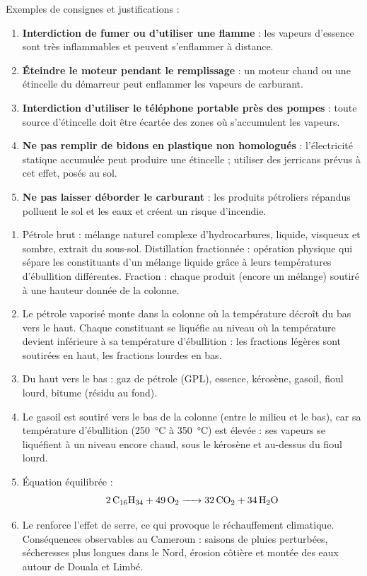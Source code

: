 \documentclass[11pt]{article}
\newcommand{\cle}[1]{{\popxbold\color{popdark}#1}}
\begin{document}
\begin{corrige}
Exemples de consignes et justifications :
\begin{enumerate}
\item \textbf{Interdiction de fumer ou d'utiliser une flamme} : les vapeurs d'essence sont très inflammables et peuvent s'enflammer à distance.
\item \textbf{Éteindre le moteur pendant le remplissage} : un moteur chaud ou une étincelle du démarreur peut enflammer les vapeurs de carburant.
\item \textbf{Interdiction d'utiliser le téléphone portable près des pompes} : toute source d'étincelle doit être écartée des zones où s'accumulent les vapeurs.
\item \textbf{Ne pas remplir de bidons en plastique non homologués} : l'électricité statique accumulée peut produire une étincelle ; utiliser des jerricans prévus à cet effet, posés au sol.
\item \textbf{Ne pas laisser déborder le carburant} : les produits pétroliers répandus polluent le sol et les eaux et créent un risque d'incendie.
\end{enumerate}
\end{corrige}

\begin{corrige}
\begin{enumerate}
\item \cle{Pétrole brut} : mélange naturel complexe d'hydrocarbures, liquide, visqueux et sombre, extrait du sous-sol. \cle{Distillation fractionnée} : opération physique qui sépare les constituants d'un mélange liquide grâce à leurs températures d'ébullition différentes. \cle{Fraction} : chaque produit (encore un mélange) soutiré à une hauteur donnée de la colonne.
\item Le pétrole vaporisé monte dans la colonne où la température décroît du bas vers le haut. Chaque constituant se liquéfie au niveau où la température devient inférieure à sa température d'ébullition : les fractions légères sont soutirées en haut, les fractions lourdes en bas.
\item Du haut vers le bas : gaz de pétrole (GPL), essence, kérosène, gasoil, fioul lourd, bitume (résidu au fond).
\item Le gasoil est soutiré vers le bas de la colonne (entre le milieu et le bas), car sa température d'ébullition (\SI{250}{\celsius} à \SI{350}{\celsius}) est élevée : ses vapeurs se liquéfient à un niveau encore chaud, sous le kérosène et au-dessus du fioul lourd.
\item Équation équilibrée :
\[ \ce{2C16H34 + 49O2 -> 32CO2 + 34H2O} \]
\item Le  renforce l'\cle{effet de serre}, ce qui provoque le réchauffement climatique. Conséquences observables au Cameroun : saisons de pluies perturbées, sécheresses plus longues dans le Nord, érosion côtière et montée des eaux autour de Douala et Limbé.
\end{enumerate}
\end{corrige}
\end{document}
